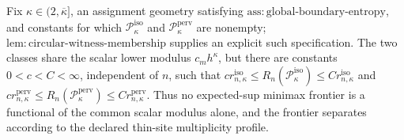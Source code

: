 Fix \(\kappa\in(2,\overline\kappa]\), an assignment geometry satisfying \(\mathrm{ass:global\text{-}boundary\text{-}entropy}\), and constants for which \(\mathcal P_{\kappa}^{\mathrm{iso}}\) and \(\mathcal P_{\kappa}^{\mathrm{perv}}\) are nonempty; \(\mathrm{lem:circular\text{-}witness\text{-}membership}\) supplies an explicit such specification. The two classes share the scalar lower modulus \(c_mh^{\kappa}\), but there are constants \(0<c<C<\infty\), independent of \(n\), such that \(c r_{n,\kappa}^{\mathrm{iso}}\le R_n(\mathcal P_{\kappa}^{\mathrm{iso}})\le C r_{n,\kappa}^{\mathrm{iso}}\) and \(c r_{n,\kappa}^{\mathrm{perv}}\le R_n(\mathcal P_{\kappa}^{\mathrm{perv}})\le C r_{n,\kappa}^{\mathrm{perv}}\). Thus no expected-sup minimax frontier is a functional of the common scalar modulus alone, and the frontier separates according to the declared thin-site multiplicity profile.